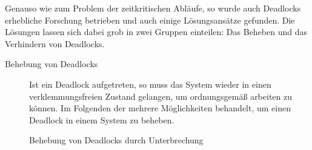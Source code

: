				Genauso wie zum Problem der zeitkritischen Abläufe, so wurde auch Deadlocks erhebliche Forschung betrieben und auch einige Lösungsansätze gefunden. Die Lösungen lassen sich dabei grob in zwei Gruppen einteilen: Das Beheben und das Verhindern von Deadlocks.			
			
				\begin{description}
					\item[Behebung von Deadlocks]
						\label{BehebungDeadlocks}
						
						Ist ein Deadlock aufgetreten, so muss das System wieder in einen verklemmungsfreien Zustand gelangen, um ordnungsgemäß arbeiten zu können. Im Folgenden der mehrere Möglichkeiten behandelt, um einen Deadlock in einem System zu beheben.
						
						\begin{description}
							\item[Behebung von Deadlocks durch Unterbrechung]
							

\end{description}
\end{description}
